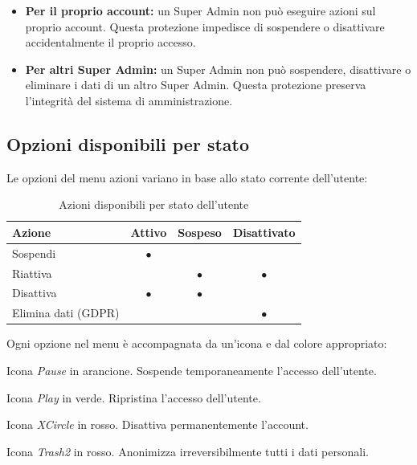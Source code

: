 \documentclass[a4paper,11pt,oneside]{book}
\begin{document}
\begin{itemize}[leftmargin=1.5em]
  \item \textbf{Per il proprio account:} un Super Admin non pu\`o eseguire azioni sul proprio account. Questa protezione impedisce di sospendere o disattivare accidentalmente il proprio accesso.
  \item \textbf{Per altri Super Admin:} un Super Admin non pu\`o sospendere, disattivare o eliminare i dati di un altro Super Admin. Questa protezione preserva l'integrit\`a del sistema di amministrazione.
\end{itemize}

\subsection{Opzioni disponibili per stato}

Le opzioni del menu azioni variano in base allo stato corrente dell'utente:

\begin{table}[htbp]
\centering
\caption{Azioni disponibili per stato dell'utente}
\label{tab:azioni-per-stato-utente}
\begin{tabularx}{\textwidth}{X c c c}
\toprule
\textbf{Azione} & \textbf{Attivo} & \textbf{Sospeso} & \textbf{Disattivato} \\
\midrule
Sospendi              & $\bullet$ &           &              \\
Riattiva              &           & $\bullet$ & $\bullet$    \\
Disattiva             & $\bullet$ & $\bullet$ &              \\
Elimina dati (GDPR)   &           &           & $\bullet$    \\
\bottomrule
\end{tabularx}
\end{table}

Ogni opzione nel menu \`e accompagnata da un'icona e dal colore appropriato:

\begin{description}[leftmargin=1.5em, style=nextline]
  \item[Sospendi] Icona \textit{Pause} in \textcolor{namoOrange}{arancione}. Sospende temporaneamente l'accesso dell'utente.
  \item[Riattiva] Icona \textit{Play} in \textcolor{namoGreen}{verde}. Ripristina l'accesso dell'utente.
  \item[Disattiva] Icona \textit{XCircle} in \textcolor{namoRed}{rosso}. Disattiva permanentemente l'account.
  \item[Elimina dati (GDPR)] Icona \textit{Trash2} in \textcolor{namoRed}{rosso}. Anonimizza irreversibilmente tutti i dati personali.
\end{description}
\end{document}
